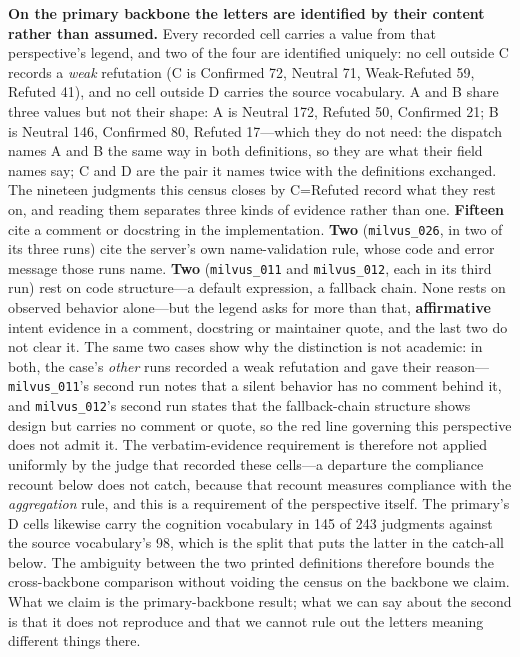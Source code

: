 \documentclass[acmsmall,screen,review,anonymous]{acmart}
\begin{document}
\textbf{On the primary backbone the letters are identified by their content rather than assumed.}
Every recorded cell carries a value from that perspective's legend, and two of the four are
identified uniquely: no cell outside C records a \emph{weak} refutation (C is Confirmed 72, Neutral
71, Weak-Refuted 59, Refuted 41), and no cell outside D carries the source vocabulary. A and B share
three values but not their shape: A is Neutral 172, Refuted 50, Confirmed 21; B is Neutral 146,
Confirmed 80, Refuted 17---which they do not need: the dispatch names A and B the same way in both
definitions, so they are what their field names say; C and D are the pair it names twice with the
definitions exchanged. The nineteen judgments this census
closes by C=Refuted record what they rest on, and reading them
separates three kinds of evidence rather than one. \textbf{Fifteen} cite a comment or docstring in the
implementation. \textbf{Two} (\texttt{milvus\_026}, in two of its three runs) cite the server's own
name-validation rule, whose code and error message those runs name. \textbf{Two}
(\texttt{milvus\_011} and \texttt{milvus\_012}, each in its third run) rest on code structure---a
default expression, a fallback chain. None rests on observed behavior alone---but the legend asks
for more than that, \textbf{affirmative} intent evidence in a comment, docstring or maintainer
quote, and the last two do not clear it. The same two cases
show why the distinction is not academic: in both, the case's \emph{other} runs recorded a weak
refutation and gave their reason---\texttt{milvus\_011}'s second run notes that a silent behavior
has no comment behind it, and \texttt{milvus\_012}'s second run states that the fallback-chain
structure shows design but carries no comment or quote, so the red line governing this perspective
does not admit it. The verbatim-evidence requirement is therefore not applied uniformly by the judge
that recorded these cells---a departure the compliance recount below does not catch, because that
recount measures compliance with the \emph{aggregation} rule, and this is a requirement of the
perspective itself. The primary's D cells likewise carry the cognition vocabulary in 145 of 243
judgments against the source vocabulary's 98, which is the split that puts the latter in the
catch-all below. The ambiguity between the two printed definitions therefore bounds the cross-backbone
comparison without voiding the census on the backbone we claim. What we claim is the primary-backbone
result; what we can say about the second is that it does not reproduce and that we cannot rule out
the letters meaning different things there.
\end{document}
